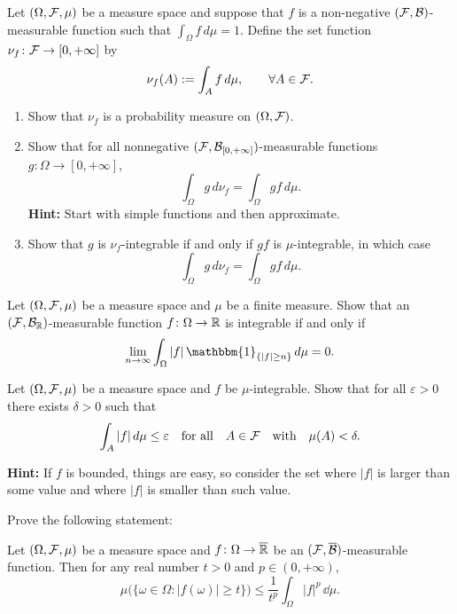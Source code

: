 \begin{problem}\label{prb:measure}
	Let $(\Omega,\mathcal F,\mu)$ be a measure space and suppose that $f$ is a non-negative $(\mathcal F,\mathcal B)$-measurable function such that $\int_\Omega f\,d\mu=1$. Define the set function $\nu_f\colon\mathcal F\to[0,+\infty]$ by
	\[
		\nu_f(A):=\int_A f\,d\mu,\qquad \forall A\in\mathcal F.
	\]
	\begin{enumerate}[label=(\alph*)]
		\item Show that $\nu_f$ is a probability measure on $(\Omega,\mathcal F)$.
		\item Show that for all nonnegative $(\mathcal F,\mathcal B_{[0,+\infty]})$-measurable functions $g\colon\Omega\to [0,+\infty]$,
		\[
			\int_\Omega g\, d\nu_f = \int_\Omega g f\,d\mu.
		\]
		\textbf{Hint:} Start with simple functions and then approximate.
		\item Show that $g$ is $\nu_f$-integrable if and only if $g f$ is $\mu$-integrable, in which case
		\[
			\int_\Omega g\,d\nu_f = \int_\Omega g f\,d\mu.
		\]
	\end{enumerate}
\end{problem}


\begin{problem}
	Let $(\Omega,\mathcal F,\mu)$ be a measure space and $\mu$ be a finite measure. Show that an $(\mathcal F,\mathcal B_{\mathbb R})$-measurable function $f\colon\Omega\to \mathbb R$ is integrable if and only if
	\[
		\lim_{n\to\infty}\int_\Omega |f|\,\mathbbm{1}_{\{|f|\ge n\}}\,d\mu = 0.
	\]
\end{problem}


\begin{problem}
	Let $(\Omega,\mathcal F,\mu)$ be a measure space and $f$ be $\mu$-integrable. Show that for all $\varepsilon>0$ there exists $\delta>0$ such that
	\[
		\int_A |f|\,d\mu\le \varepsilon\quad \text{for all}\quad A\in\mathcal F\quad \text{with}\quad \mu(A)<\delta.
	\]
	
\smallskip
	
	\noindent\textbf{Hint:} If $f$ is bounded, things are easy, so consider the set where $|f|$ is larger than some value and where $|f|$ is smaller than such value.
\end{problem}

\begin{problem}
	Prove the following statement: 
	
	\smallskip
	Let $(\Omega,\mathcal F,\mu)$ be a measure space and $f\colon \Omega\to \overline{\mathbb R}$ be an $(\mathcal F,\overline{\mathcal B})$-measurable function. Then for any real number $t>0$ and $p\in(0,+\infty)$,
	\[
		\mu\bigl(\{\omega\in\Omega : |f(\omega)|\ge t\}\bigr) \le \frac{1}{t^p}\int_\Omega |f|^p\,\dd\mu.
	\]
\end{problem}

